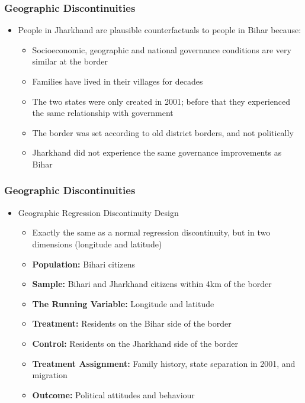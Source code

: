 \documentclass[xcolor=x11names,compress]{beamer}\usepackage[]{graphicx}\usepackage[]{color}
\renewcommand{\(}{\begin{columns}}
\renewcommand{\)}{\end{columns}}
\newcommand{\<}[1]{\begin{column}{#1}}
\renewcommand{\>}{\end{column}}
\begin{document}
\begin{frame}
\frametitle{Geographic Discontinuities}
\begin{itemize}
\item People in Jharkhand are plausible counterfactuals to people in Bihar because:
\pause
\begin{itemize}
\item Socioeconomic, geographic and national governance conditions are very similar at the border
\pause
\item Families have lived in their villages for decades
\pause
\item The two states were only created in 2001; before that they experienced the same relationship with government
\pause
\item The border was set according to old district borders, and not politically
\pause
\item Jharkhand did not experience the same governance improvements as Bihar
\end{itemize}
\end{itemize}
\end{frame}


\begin{frame}
\frametitle{Geographic Discontinuities}
\begin{itemize}
\item Geographic Regression Discontinuity Design
\begin{itemize}
\item Exactly the same as a normal regression discontinuity, but in two dimensions (longitude and latitude)
\pause
\item \textbf{Population:} \pause Bihari citizens
\pause 
\item \textbf{Sample:} \pause Bihari and Jharkhand citizens within 4km of the border
\pause 
\item \textbf{The Running Variable:} \pause Longitude and latitude
\pause 
\item \textbf{Treatment:} \pause Residents on the Bihar side of the border
\pause 
\item \textbf{Control:} \pause Residents on the Jharkhand side of the border
\pause 
\item \textbf{Treatment Assignment:} \pause Family history, state separation in 2001, and migration
\pause 
\item \textbf{Outcome:} \pause Political attitudes and behaviour
\end{itemize}
\end{itemize}
\end{frame}
\end{document}
